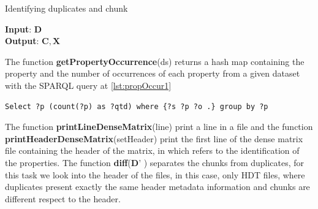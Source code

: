 \begin{algorithm} [htb] 
	\caption{Identifying duplicates and chunk}
	\label{alg:iss1}
    \begin{multicols}{2}
    	\textbf{Input}: $\mathbf{D}$  \\
    	\textbf{Output}: $\mathbf{C}, \mathbf{X}$  
    	\begin{algorithmic}[1]
    	     
    	         
    	        \EndFor
    	         
    	        \Else
    	        \EndIf
    	    \EndFor
    	     
     		 
    	\end{algorithmic}
	\end{multicols}
\end{algorithm}    	

The function \textbf{getPropertyOccurrence}(ds) returns a hash map containing the property and the number of occurrences of each property from a given dataset with the SPARQL query at \cref{lst:propOccur1} 

\begin{lstlisting}[language=SPARQL, label={lst:propOccur1}, caption=Property occurrence query.]
Select ?p (count(?p) as ?qtd) where {?s ?p ?o .} group by ?p
\end{lstlisting}
The function \textbf{printLineDenseMatrix}(line) print a line in a file and the function \textbf{printHeaderDenseMatrix}(setHeader) print the first line of the dense matrix file containing the header of the matrix, in which refers to the identification of the properties.
The function \textbf{diff}($\mathbf{D’}$ ) separates the chunks from duplicates, for this task we look into the header of the files, in this case, only HDT files, where duplicates present exactly the same header metadata information and chunks are different respect to the header.

